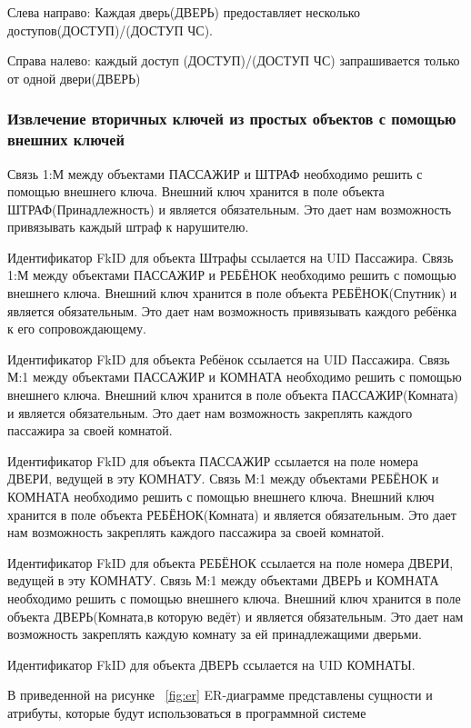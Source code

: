 Слева направо: Каждая дверь(ДВЕРЬ) предоставляет несколько доступов(ДОСТУП)/(ДОСТУП ЧС).

Справа налево: каждый доступ (ДОСТУП)/(ДОСТУП ЧС) запрашивается только от одной двери(ДВЕРЬ)

\subsubsection{Извлечение вторичных ключей из простых объектов с помощью внешних ключей}

Связь 1:М между объектами ПАССАЖИР и ШТРАФ необходимо решить с помощью внешнего ключа. 
Внешний ключ хранится в поле объекта ШТРАФ(Принадлежность) и является обязательным. Это дает нам возможность привязывать каждый штраф к нарушителю.
 
Идентификатор FkID для объекта Штрафы ссылается на UID Пассажира.
Связь 1:М между объектами ПАССАЖИР и РЕБЁНОК необходимо решить с помощью внешнего ключа. 
Внешний ключ хранится в поле объекта РЕБЁНОК(Спутник) и является обязательным. Это дает нам возможность привязывать каждого ребёнка к его сопровождающему.
 
Идентификатор FkID для объекта Ребёнок ссылается на UID Пассажира.
Связь М:1 между объектами ПАССАЖИР и КОМНАТА необходимо решить с помощью внешнего ключа. 
Внешний ключ хранится в поле объекта ПАССАЖИР(Комната) и является обязательным. Это дает нам возможность закреплять каждого пассажира за своей комнатой.
 
Идентификатор FkID для объекта ПАССАЖИР ссылается на поле номера ДВЕРИ, ведущей в эту КОМНАТУ.
Связь М:1 между объектами РЕБЁНОК и КОМНАТА необходимо решить с помощью внешнего ключа. 
Внешний ключ хранится в поле объекта РЕБЁНОК(Комната) и является обязательным. Это дает нам возможность закреплять каждого пассажира за своей комнатой.
 
Идентификатор FkID для объекта РЕБЁНОК ссылается на поле номера ДВЕРИ, ведущей в эту КОМНАТУ.
Связь М:1 между объектами ДВЕРЬ и КОМНАТА необходимо решить с помощью внешнего ключа. 
Внешний ключ хранится в поле объекта ДВЕРЬ(Комната,в которую ведёт) и является обязательным. Это дает нам возможность закреплять каждую комнату за ей принадлежащими дверьми.
 
Идентификатор FkID для объекта ДВЕРЬ ссылается на UID  КОМНАТЫ.

В приведенной на рисунке ~\ref{fig:er} ER-диаграмме представлены сущности и атрибуты, которые будут использоваться в программной системе 

